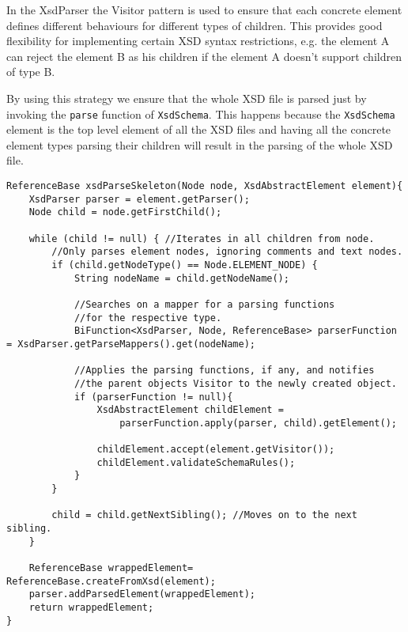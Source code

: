 \noindent
In the XsdParser the Visitor pattern is used to ensure that each concrete element defines different behaviours for different types of children. This provides good flexibility for implementing certain \ac{XSD} syntax restrictions, e.g. the element A can reject the element B as his children if the element A doesn't support children of type B.

\noindent
By using this strategy we ensure that the whole \ac{XSD} file is parsed just by invoking the \texttt{parse} function of \texttt{XsdSchema}. This happens because the \texttt{XsdSchema} element is the top level element of all the \ac{XSD} files and having all the concrete element types parsing their children will result in the parsing of the whole \ac{XSD} file.

\bigskip


\begin{minipage}{\linewidth}
\begin{lstlisting}[caption={XsdParseSkeleton Parsing Children From a Node},captionpos=b,label={lst:skeletonfunction}]
ReferenceBase xsdParseSkeleton(Node node, XsdAbstractElement element){
    XsdParser parser = element.getParser();
    Node child = node.getFirstChild();

    while (child != null) { //Iterates in all children from node.
        //Only parses element nodes, ignoring comments and text nodes.
        if (child.getNodeType() == Node.ELEMENT_NODE) { 
            String nodeName = child.getNodeName();

            //Searches on a mapper for a parsing functions 
            //for the respective type.
            BiFunction<XsdParser, Node, ReferenceBase> parserFunction = XsdParser.getParseMappers().get(nodeName);

            //Applies the parsing functions, if any, and notifies 
            //the parent objects Visitor to the newly created object.
            if (parserFunction != null){
                XsdAbstractElement childElement =
                	parserFunction.apply(parser, child).getElement();
                
                childElement.accept(element.getVisitor());
                childElement.validateSchemaRules();
            }
        }

        child = child.getNextSibling(); //Moves on to the next sibling.
    }

    ReferenceBase wrappedElement= ReferenceBase.createFromXsd(element);
    parser.addParsedElement(wrappedElement);
    return wrappedElement;
}
\end{lstlisting}
\end{minipage}

